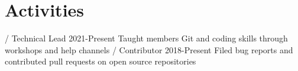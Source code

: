 \section{Activities}
\begin{doutline}
     / Technical Lead \hfill 2021-Present
        \2 Taught members Git and coding skills through workshops and help channels
     / Contributor \hfill 2018-Present
        \2 Filed bug reports and contributed pull requests on open source repositories
\end{doutline}
